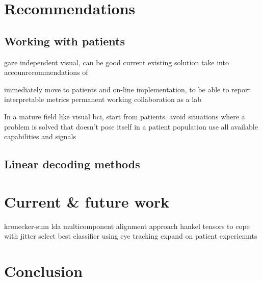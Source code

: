 \section{Recommendations}
\subsection{Working with patients}
gaze independent visual, can be good current existing solution
take into accounrecommendations of \textcite{FriedOken2020}

immediately move to patients and on-line implementation, to be able to report
interpretable metrics
permanent working collaboration as a lab

In a mature field like visual bci, start from patients.
avoid situations where a problem is solved that doesn't pose itself in a
patient population
use all available capabilities and signals


\subsection{Linear decoding methods}


\section{Current \& future work}
kronecker-sum lda
multicomponent alignment approach
hankel tensors to cope with jitter
select best classifier using eye tracking
expand on patient experiemnts

\section{Conclusion}
